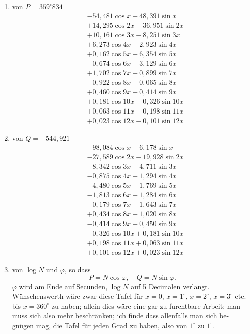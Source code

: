 \documentclass[10pt,a4paper]{article}
\begin{document}
\begin{enumerate}
\item[$1^\circ$)] von $P = 359^{\circ}834$
\begin{align*}
&- 54,481 \cos x + 48,391 \sin x \\
&+ 14,295 \cos 2x - 36,951 \sin 2x \\
&+ 10,161 \cos 3x - 8,251 \sin 3x \\
&+ 6,273 \cos 4x + 2,923 \sin 4x \\
&+ 0,162 \cos 5x + 6,354 \sin 5x \\
&- 0,674 \cos 6x + 3,129 \sin 6x \\
&+ 1,702 \cos 7x + 0,899 \sin 7x \\
&- 0,922 \cos 8x - 0,065 \sin 8x \\
&+ 0,460 \cos 9x - 0,414 \sin 9x \\
&+ 0,181 \cos 10x - 0,326 \sin 10x \\
&+ 0,063 \cos 11x - 0,198 \sin 11x \\
&+ 0,023 \cos 12x - 0,101 \sin 12x
\end{align*}

\item[$2^\circ$)] von $Q = -544,921$
\begin{align*}
&- 98,084 \cos x - 6,178 \sin x \\
&- 27,589 \cos 2x - 19,928 \sin 2x \\
&- 8,342 \cos 3x - 4,711 \sin 3x \\
&- 0,875 \cos 4x - 1,294 \sin 4x \\
&- 4,480 \cos 5x - 1,769 \sin 5x \\
&- 1,813 \cos 6x - 1,284 \sin 6x \\
&- 0,179 \cos 7x - 1,643 \sin 7x \\
&+ 0,434 \cos 8x - 1,020 \sin 8x \\
&- 0,414 \cos 9x - 0,450 \sin 9x \\
&- 0,326 \cos 10x + 0,181 \sin 10x \\
&+ 0,198 \cos 11x + 0,063 \sin 11x \\
&+ 0,101 \cos 12x + 0,023 \sin 12x
\end{align*}

\item[$3^\circ$)] von $\log N$ und $\varphi$, so dass
\[
P = N \cos \varphi, \quad Q = N \sin \varphi.
\]
$\varphi$ wird am Ende auf Secunden, $\log N$ auf 5 Decimalen verlangt. Wünschenswerth 
wäre zwar diese Tafel für $x = 0$, $x = 1^{\circ}$, $x = 2^{\circ}$, $x = 3^{\circ}$ etc. bis 
$x = 360^{\circ}$ zu haben; allein dies wäre eine gar zu furchtbare Arbeit; man 
muss sich also mehr beschränken; ich finde dass allenfalls man sich be-
gnügen mag, die Tafel für jeden Grad zu haben, also von $1^{\circ}$ zu $1^{\circ}$.
\end{enumerate}
\end{document}
